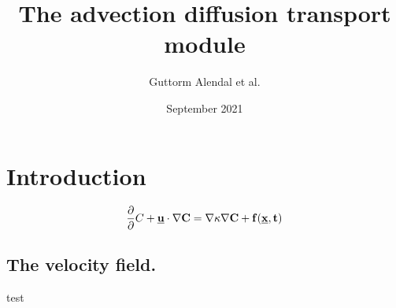 \documentclass{article}
\title{The advection diffusion transport module}
\author{Guttorm Alendal et al. }
\date{September 2021}
\begin{document}
\maketitle
\section{Introduction}

\begin{equation}\label{eq:advdiff}
    \frac{\partial}{\partial} C + \bf{\underline{u}} \cdot \nabla C = \nabla \kappa \nabla C + f(\bf{\underline{x}},t)
\end{equation}

\subsection{The velocity field.}
\clearpage
\cite{aliSimulatingSpatialTemporal2016}

test 

\autocite{fallahiNewConceptualToxicokinetic2020}
\printbibliography
\end{document}
